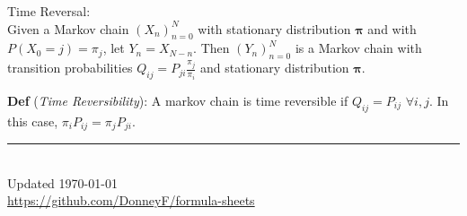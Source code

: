 \documentclass[12pt,landscape]{article}
\newcommand{\tab}{\hspace*{1em}}
\newcommand{\defn}[1]{\textbf{Def} (\emph{#1})}
\theoremstyle{definition}
\begin{document}
\begin{minipage}[t]{0.33\textwidth}
Time Reversal:\\
\tab Given a Markov chain $(X_n)^N_{n=0}$ with stationary distribution $\boldsymbol{\pi}$ and with $P(X_0 = j) = \pi_j$, let $Y_n = X_{N-n}$. Then $(Y_n)^N_{n=0}$ is a Markov chain with transition probabilities $Q_{ij} = P_{ji}\frac{\pi_j}{\pi_i}$ and stationary distribution $\boldsymbol{\pi}$.

\defn{Time Reversibility}: A markov chain is time reversible if $Q_{ij} = P_{ij}$ $\forall i,j$. In this case, $\pi_i P_{ij} = \pi_j P_{ji}$.

\rule{0.3\linewidth}{0.25pt}
\scriptsize\\
Updated \today\\
\href{https://github.com/DonneyF/formula-sheets}{https://github.com/DonneyF/formula-sheets}
\end{minipage}%
\hspace{0.5em}
\end{document}
